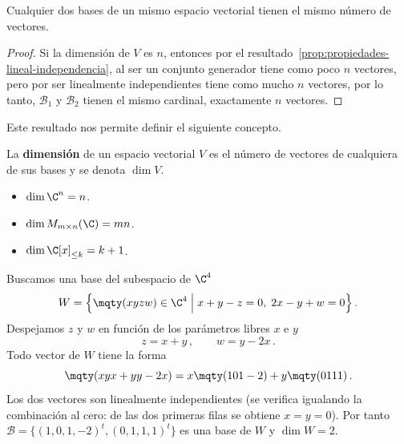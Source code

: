 \begin{prop}
  Cualquier dos bases de un mismo espacio vectorial tienen el mismo número de vectores.
\end{prop}
\begin{proof}
  Si la dimensión de $V$ es $n$, entonces por el resultado~\ref{prop:propiedades-lineal-independencia}, al ser un conjunto generador tiene como poco $n$ vectores, pero por ser linealmente independientes tiene como mucho $n$ vectores, por lo tanto, $\mathcal{B}_1$ y $\mathcal{B}_2$ tienen el mismo cardinal, exactamente $n$ vectores.
\end{proof}

Este resultado nos permite definir el siguiente concepto.

\begin{defi}[Dimensión]
  La \textbf{dimensión} de un espacio vectorial $V$ es el número de vectores de cualquiera de sus bases y se denota $\dim V$.
\end{defi}

\begin{eje}
  \begin{itemize}
    \item $\dim\C^n = n$.
    \item $\dim M_{m\times n}(\C) = mn$.
    \item $\dim\C[x]_{\leq k} = k+1$.
  \end{itemize}
\end{eje}

\begin{eje}
  Buscamos una base del subespacio de $\C^4$
  \[
    W = \left\{\mqty(x\\y\\z\\w)\in\C^4 \;\Big|\; x+y-z=0,\; 2x-y+w=0\right\}.
  \]
  Despejamos $z$ y $w$ en función de los parámetros libres $x$ e $y$
  \[
    z = x+y\,,\qquad w = y-2x\,.
  \]
  Todo vector de $W$ tiene la forma
  \[
    \mqty(x\\y\\x+y\\y-2x) = x\mqty(1\\0\\1\\-2) + y\mqty(0\\1\\1\\1)\,.
  \]
  Los dos vectores son linealmente independientes (se verifica igualando la combinación al cero: de las dos primeras filas se obtiene $x=y=0$). Por tanto $\mathcal{B}=\{(1,0,1,-2)^t,(0,1,1,1)^t\}$ es una base de $W$ y $\dim W = 2$.
\end{eje}

